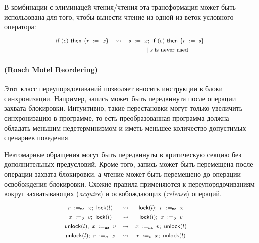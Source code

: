 В комбинации с элиминацей чтения/чтения 
эта трансформация может быть использована 
для того, чтобы вынести чтение из 
одной из веток условного оператора:
%
\[\def\arraystretch{1.4}\footnotesize
  \begin{array}{ccc} 

      \kw{if} (e)~ \kw{then} \{ \readInst{}{r}{x} \}
    & \leadsto 
    & \readInst{}{s}{x} \seq \kw{if} (e)~ \kw{then} \{ \assignInst{r}{s} \} \\
    & & ~|~ \text{$s$ is never used}  \\ 

  \end{array}
\]

\paragraph{
(Roach Motel Reordering)
}

Этот класс переупорядочиваний позволяет 
вносить инструкции в блоки синхронизации. 
Например, запись может быть передвинута 
после операции захвата блокировки. 
Интуитивно, такие перестановки могут 
только увеличить синхронизацию в программе, 
то есть преобразованная программа 
должна обладать меньшим недетерминизмом 
и иметь меньшее количество допустимых сценариев поведения. 

Неатомарные обращения могут быть передвинуты 
в критическую секцию без дополнительных предусловий. 
Кроме того, запись может быть перемещена после 
операции захвата блокировки, а чтение 
может быть перемещено до операции освобождения блокировки. 
Схожие правила применяются к переупорядочиваниям вокруг 
захватывающих (\emph{acquire}) и освобождающих (\emph{release}) операций. 
\[\def\arraystretch{1.4}\footnotesize
  \begin{array}{cccl} 

      \readInst{\na}{r}{x} \seq \lockInst{l} 
    & \leadsto 
    & \lockInst{l} \seq \readInst{\na}{r}{x}
    & ~ \\ 

      \writeInst{o}{x}{v} \seq \lockInst{l} 
    & \leadsto 
    & \lockInst{l} \seq \writeInst{o}{x}{v}
    & ~  \\ 

      \unlockInst{l} \seq \writeInst{\na}{x}{v} 
    & \leadsto 
    & \writeInst{\na}{x}{v} \seq \unlockInst{l}
    & ~ \\ 


      \unlockInst{l} \seq \readInst{o}{r}{x} 
    & \leadsto 
    & \readInst{o}{r}{x} \seq \unlockInst{l}
    & ~  \\ 

  \end{array}
\]


